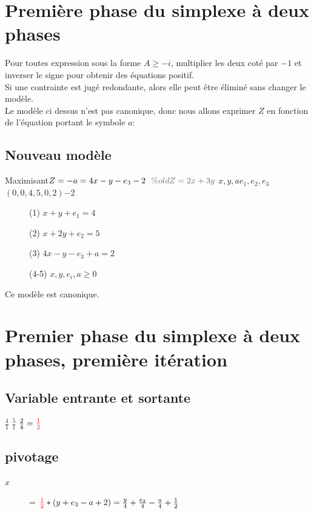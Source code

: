 \section{Première phase du simplexe à deux phases}
Pour toutes expression sous la forme $ A \geqslant -i$, multiplier les deux coté par $-1$ et inverser le signe pour obtenir des équations positif.\\
Si une contrainte est jugé redondante, alors elle peut être éliminé sans changer le modèle.\\
Le modèle ci dessus n'est pas canonique, donc nous allons exprimer $Z$ en fonction de l'équation portant le symbole $a$:\\
\subsection{Nouveau modèle}
        {Maximisant}{$Z = -a = 4x -y -e_3 -2\ \ \cgris{\% oldZ = 2x + 3y}$}
        {$x,y,a$}{$e_1,e_2,e_3$}{$(0,0,4,5,0,2)$}{$-2$}
        {\begin{description}
\item[] (1) $x + y + e_1 = 4$
\item[] (2) $x + 2y + e_2 = 5$
\item[] (3) $4x -y - e_3 + a = 2$
\item[] (4-5) $x,y,e_i,a \geqslant 0$
\end{description}
}
Ce modèle est canonique.

\section{Premier phase du simplexe à deux phases, première itération}
\subsection{Variable entrante et sortante}
  {$\frac{4}{1}$}
  {$\frac{5}{1}$}
  {$\frac{2}{4} = \textcolor{red}{\frac{1}{2}}$}

\subsection{pivotage}
\begin{description}
\item[$x$] = $\textcolor{red}{\frac{1}{2}}*(y+ e_3 -a +2) = \frac{y}{4} + \frac{e_3}{4} - \frac{a}{4} + \frac{1}{2}$
\end{description}

